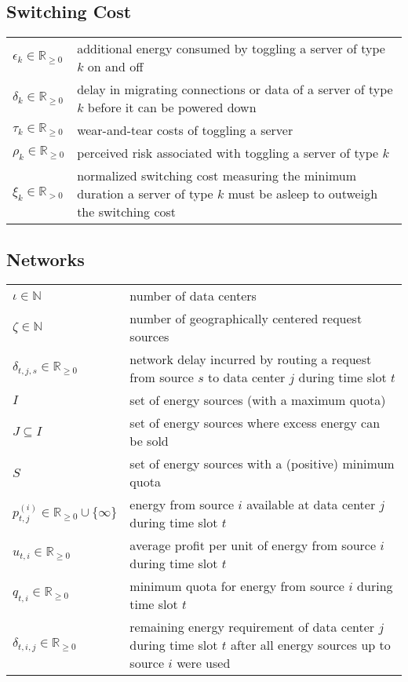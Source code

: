 \subsection*{Switching Cost}

\begin{tabularx}{\textwidth}{lX}
    $\epsilon_k \in \mathbb{R}_{\geq 0}$ & additional energy consumed by toggling a server of type $k$ on and off \\
    $\delta_k \in \mathbb{R}_{\geq 0}$ & delay in migrating connections or data of a server of type $k$ before it can be powered down \\
    $\tau_k \in \mathbb{R}_{\geq 0}$ & wear-and-tear costs of toggling a server \\
    $\rho_k \in \mathbb{R}_{\geq 0}$ & perceived risk associated with toggling a server of type $k$ \\
    $\xi_k \in \mathbb{R}_{>0}$ & normalized switching cost measuring the minimum duration a server of type $k$ must be asleep to outweigh the switching cost \\
\end{tabularx}

\vspace{\fill}

\subsection*{Networks}

\begin{tabularx}{\textwidth}{lX}
    $\iota \in \mathbb{N}$ & number of data centers \\
    $\zeta \in \mathbb{N}$ & number of geographically centered request sources \\
    $\delta_{t,j,s} \in \mathbb{R}_{\geq 0}$ & network delay incurred by routing a request from source $s$ to data center $j$ during time slot $t$ \\
    $I$ & set of energy sources (with a maximum quota) \\
    $J \subseteq I$ & set of energy sources where excess energy can be sold \\
    $S$ & set of energy sources with a (positive) minimum quota \\
    $p_{t,j}^{(i)} \in \mathbb{R}_{\geq 0} \cup \{\infty\}$ & energy from source $i$ available at data center $j$ during time slot $t$ \\
    $u_{t,i} \in \mathbb{R}_{\geq 0}$ & average profit per unit of energy from source $i$ during time slot $t$ \\
    $q_{t,i} \in \mathbb{R}_{\geq 0}$ & minimum quota for energy from source $i$ during time slot $t$ \\
    $\delta_{t,i,j} \in \mathbb{R}_{\geq 0}$ & remaining energy requirement of data center $j$ during time slot $t$ after all energy sources up to source $i$ were used \\
\end{tabularx}

